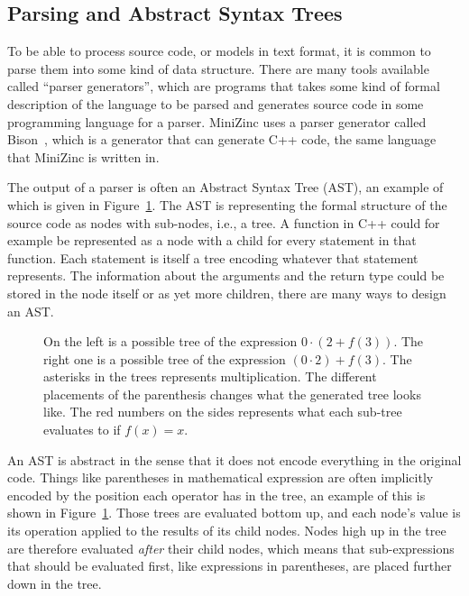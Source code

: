 \documentclass[a4paper,12pt]{article}
\begin{document}
\subsection{Parsing and Abstract Syntax Trees}\label{sec:parsing}
To be able to process source code, or models in text format, it is common to parse them
into some kind of data structure. There are many tools available called ``parser
generators'', which are programs that takes some kind of formal description of the
language to be parsed and generates source code in some programming language for a parser.
MiniZinc uses a parser generator called Bison~\cite{flexbison}, which is a generator that
can generate C++ code, the same language that MiniZinc is written in.

The output of a parser is often an Abstract Syntax Tree (AST), an example of which is
given in Figure~\ref{fig:bkg:ast}. The AST is representing the formal structure of the
source code as nodes with sub-nodes, i.e., a tree. A function in C++ could
for example be represented as a node with a child for every statement in that function.
Each statement is itself a tree encoding whatever that statement represents. The
information about the arguments and the return type could be stored in the node itself or
as yet more children, there are many ways to design an AST.

\begin{figure}[ht]
  \centering
  
  \caption{On the left is a possible tree of the expression $0\cdot(2+f(3))$. The right one
    is a possible tree of the expression $(0 \cdot 2)+f(3)$. The asterisks in the trees
    represents multiplication. The different placements of the parenthesis changes what the
    generated tree looks like. The red numbers on the sides represents what each sub-tree
    evaluates to if $f(x) = x$.}%
  \label{fig:bkg:ast}
\end{figure}

An AST is abstract in the sense that it does not encode everything in the original code.
Things like parentheses in mathematical expression are often implicitly encoded by the
position each operator has in the tree, an example of this is shown in
Figure~\ref{fig:bkg:ast}. Those trees are evaluated bottom up, and each node's value is
its operation applied to the results of its child nodes. Nodes high up in the tree are
therefore evaluated \emph{after} their child nodes, which means that sub-expressions that
should be evaluated first, like expressions in parentheses, are placed further down in the
tree.
\end{document}
